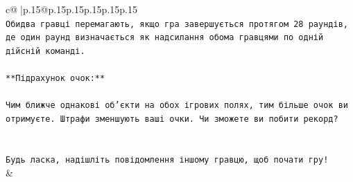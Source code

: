 \documentclass{article}
\begin{document}
{\begin{supertabular}{c@{$\;$}|p{.15\linewidth}@{}p{.15\linewidth}p{.15\linewidth}p{.15\linewidth}p{.15\linewidth}p{.15\linewidth}}
{{{\\ 
\texttt{Обидва гравці перемагають, якщо гра завершується протягом 28 раундів, де один раунд визначається як надсилання обома гравцями по одній дійсній команді.} \\
\\ 
\texttt{**Підрахунок очок:**} \\
\\ 
\texttt{Чим ближче однакові об'єкти на обох ігрових полях, тим більше очок ви отримуєте. Штрафи зменшують ваші очки. Чи зможете ви побити рекорд?} \\
\\ 
\\ 
\texttt{Будь ласка, надішліть повідомлення іншому гравцю, щоб почати гру!} \\
            }
        }
    }
    & \\ \\


\end{supertabular}}
\end{document}

